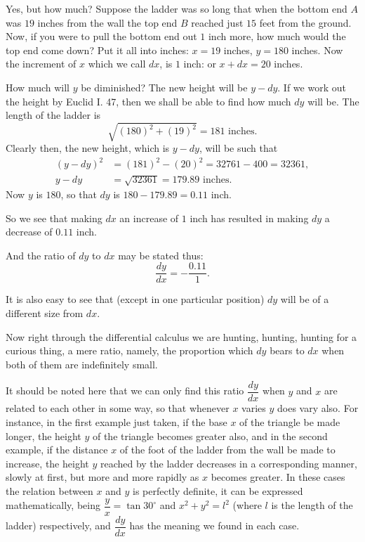 \documentclass{ximera}
\begin{document}
Yes, but how much? Suppose the ladder was so
long that when the bottom end $A$ was $19$ inches from
the wall the top end $B$ reached just $15$ feet from the
ground. Now, if you were to pull the bottom end
out $1$ inch more, how much would the top end come
down? Put it all into inches: $x = 19$ inches, $y = 180$
inches. Now the increment of $x$ which we call $dx$,
is $1$ inch: or $x + dx = 20$ inches.

How much will $y$ be diminished? The new height
will be $y - dy$. If we work out the height by Euclid
I. 47, then we shall be able to find how much $dy$ will
be. The length of the ladder is
\[
\sqrt{ (180)^2 + (19)^2 } = 181 \text{ inches}.
\]
Clearly then, the new height, which is $y - dy$, will be
such that
\begin{align*}
(y - dy)^2 &= (181)^2 - (20)^2 = 32761 - 400 = 32361,   \\
y - dy     &= \sqrt{32361} = 179.89 \text{ inches}.
\end{align*}
Now $y$ is $180$, so that $dy$ is $180 - 179.89 = 0.11$ inch.

So we see that making $dx$ an increase of $1$ inch
has resulted in making $dy$ a decrease of $0.11$ inch.

And the ratio of $dy$ to $dx$ may be stated thus:
\[
\frac{dy}{dx} = - \frac{0.11}{1}.
\]

It is also easy to see that (except in one particular
position) $dy$ will be of a different size from $dx$.

Now right through the differential calculus we
are hunting, hunting, hunting for a curious thing, a mere ratio, namely, the proportion which $dy$ bears
to $dx$ when both of them are indefinitely
small.

It should be noted here that we can only find
this ratio $\dfrac{dy}{dx}$ when $y$ and $x$ are related to each
other in some way, so that whenever $x$ varies $y$ does
vary also. For instance, in the first example just
taken, if the base $x$ of the triangle be made longer,
the height $y$ of the triangle becomes greater also,
and in the second example, if the distance $x$ of the
foot of the ladder from the wall be made to increase,
the height $y$ reached by the ladder decreases in a
corresponding manner, slowly at first, but more and
more rapidly as $x$ becomes greater. In these cases
the relation between $x$ and $y$ is perfectly definite,
it can be expressed mathematically, being $\dfrac{y}{x} = \tan 30^{\circ}$
and $x^2 + y^2 = l^2$ (where $l$ is the length of the ladder)
respectively, and $\dfrac{dy}{dx}$ has the meaning we found in
each case.
\end{document}
